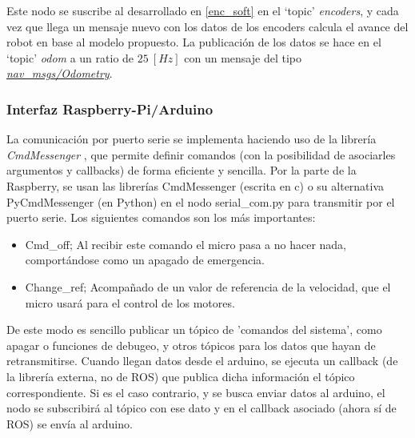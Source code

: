 \par
Este nodo se suscribe al desarrollado en \ref{enc_soft} en el `topic' \textit{encoders}, y cada vez que llega un mensaje nuevo con los datos de los 
encoders calcula el avance del robot en base al modelo propuesto. La publicación de los datos se hace en el `topic' \textit{odom} a un ratio de $25\ [Hz]$ con un mensaje del tipo \textit{\href{http://docs.ros.org/kinetic/api/nav_msgs/html/msg/Odometry.html}{nav\_msgs/Odometry}}.

\subsubsection{Interfaz Raspberry-Pi/Arduino}
La comunicación por puerto serie se implementa haciendo uso de la librería \textit{CmdMessenger} \cite{CmdMessenger}, que permite definir comandos (con la posibilidad de asociarles argumentos y callbacks) de forma eficiente y sencilla.
Por la parte de la Raspberry, se usan las librerías CmdMessenger (escrita en c) o su alternativa PyCmdMessenger (en Python) en el nodo serial\_com.py para transmitir por el puerto serie. Los siguientes comandos son los más importantes: \\
\begin{itemize}
	\item Cmd\_off; Al recibir este comando el micro pasa a no hacer nada, comportándose como un apagado de emergencia.
	\item Change\_ref; Acompañado de un valor de referencia de la velocidad, que el micro usará para el control de los motores.
\end{itemize}
\par
De este modo es sencillo publicar un tópico de 'comandos del sistema', como apagar o funciones de debugeo, y otros tópicos para los datos que hayan de retransmitirse. Cuando llegan datos desde el arduino, se ejecuta un callback (de la librería externa, no de ROS) que publica dicha información el tópico correspondiente. Si es el caso contrario, y se busca enviar datos al arduino, el nodo se subscribirá al tópico con ese dato y en el callback asociado (ahora sí de ROS) se envía al arduino.

